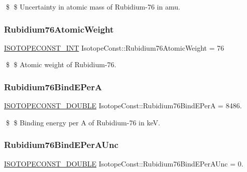 \$ \$ Uncertainty in atomic mass of Rubidium-\/76 in amu. \mbox{\label{group___isotope_const-_rubidium-_rb76_ga3cb3ec8cf9b4134438c07ad05f58eac2}} 
\subsubsection{\texorpdfstring{Rubidium76\+Atomic\+Weight}{Rubidium76AtomicWeight}}
{\footnotesize\ttfamily \mbox{\hyperlink{group___isotope_const-_macros_ga5f18360b3e99483a35c32d789e62621c}{I\+S\+O\+T\+O\+P\+E\+C\+O\+N\+S\+T\+\_\+\+I\+NT}} Isotope\+Const\+::\+Rubidium76\+Atomic\+Weight = 76}

\$ \$ Atomic weight of Rubidium-\/76. \mbox{\label{group___isotope_const-_rubidium-_rb76_gaec75d5ab19acc06f5d52d8fabc46e254}} 
\subsubsection{\texorpdfstring{Rubidium76\+Bind\+E\+PerA}{Rubidium76BindEPerA}}
{\footnotesize\ttfamily \mbox{\hyperlink{group___isotope_const-_macros_ga8f45a7272ce02c0b4c65c44636ed719a}{I\+S\+O\+T\+O\+P\+E\+C\+O\+N\+S\+T\+\_\+\+D\+O\+U\+B\+LE}} Isotope\+Const\+::\+Rubidium76\+Bind\+E\+PerA = 8486.}

\$ \$ Binding energy per A of Rubidium-\/76 in keV. \mbox{\label{group___isotope_const-_rubidium-_rb76_ga29da7a2ecb5ab94afb862c8019c5cdd4}} 
\subsubsection{\texorpdfstring{Rubidium76\+Bind\+E\+Per\+A\+Unc}{Rubidium76BindEPerAUnc}}
{\footnotesize\ttfamily \mbox{\hyperlink{group___isotope_const-_macros_ga8f45a7272ce02c0b4c65c44636ed719a}{I\+S\+O\+T\+O\+P\+E\+C\+O\+N\+S\+T\+\_\+\+D\+O\+U\+B\+LE}} Isotope\+Const\+::\+Rubidium76\+Bind\+E\+Per\+A\+Unc = 0.}

